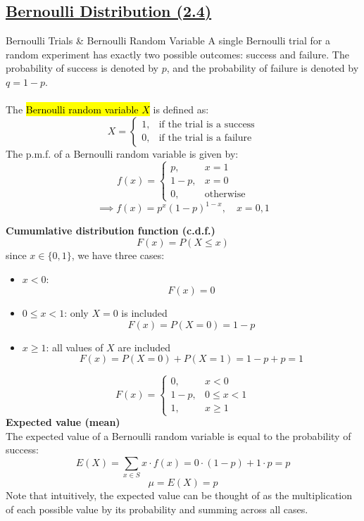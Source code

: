 ﻿\documentclass[12pt]{article}
\begin{document}
\subsection*{\underline{Bernoulli Distribution (2.4)}}
\begin{definition}{Bernoulli Trials \& Bernoulli Random Variable}
    A single Bernoulli trial for a random experiment has exactly two possible outcomes: success and failure. The probability of success is denoted by $p$, and the probability of failure is denoted by $q=1-p$.\\\\
    The \hl{Bernoulli random variable $X$} is defined as:
    \[X = \begin{cases}
    1, & \text{if the trial is a success}\\
    0, & \text{if the trial is a failure}
    \end{cases}\]
    The p.m.f. of a Bernoulli random variable is given by:
    \[f(x) = \begin{cases}
    p, & x=1\\
    1-p, & x=0\\
    0, & \text{otherwise}
    \end{cases}\]
    \[\implies \boxed{f(x)= p^x(1-p)^{1-x}, \quad x=0,1}\]
\end{definition}
\newpage
\textbf{Cumumlative distribution function (c.d.f.)}\\
\[
F(x)=P(X\leq x)
\]
since $x\in\{0,1\}$, we have three cases:
\begin{itemize}
    \item $x<0$: $$F(x)=0$$
    \item $0\leq x<1$: only $X=0$ is included  $$F(x)=P(X=0)=1-p$$
    \item $x\geq 1$: all values of $X$ are included $$F(x)=P(X=0)+P(X=1)=1-p+p=1$$
\end{itemize}
\[
\boxed{
F(x)=
\begin{cases}
0,&x<0\\
1-p,&0\leq x<1\\
1,&x\geq1
\end{cases}
}
\]
\textbf{Expected value (mean)}\\
The expected value of a Bernoulli random variable is equal to the probability of success:
    \[E(X) = \sum_{x\in S}x\cdot f(x) =  0\cdot(1-p) + 1\cdot p = p\]
\[
\boxed{\mu=E(X)=p}
\]
Note that intuitively, the expected value can be thought of as the multiplication of each possible value by its probability and summing across all cases.\\\\
\end{document}
